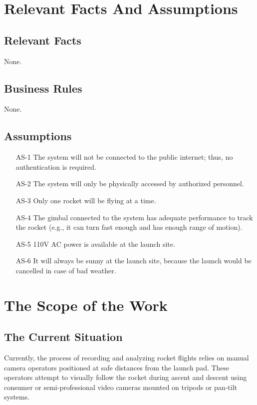 \documentclass[12pt]{article}
\begin{document}
\section{Relevant Facts And Assumptions}
\subsection{Relevant Facts}

None.

\subsection{Business Rules}

None.

\subsection{Assumptions}

\begin{itemize}[leftmargin=*]
  \item[AS-1] The system will not be connected to the public internet; thus, no
        authentication is required.
  \item[AS-2] The system will only be physically accessed by authorized personnel.
  \item[AS-3] Only one rocket will be flying at a time.
  \item[AS-4] The gimbal connected to the system has adequate performance to track the
        rocket (e.g., it can turn fast enough and has enough range of motion).
  \item[AS-5] 110V AC power is available at the launch site.
  \item[AS-6] It will always be sunny at the launch site, because the launch would be
        cancelled in case of bad weather.
\end{itemize}

\section{The Scope of the Work}
\subsection{The Current Situation}

Currently, the process of recording and analyzing rocket flights relies on
manual camera operators positioned at safe distances from the launch pad. These
operators attempt to visually follow the rocket during ascent and descent using
consumer or semi-professional video cameras mounted on tripods or pan-tilt
systems.
\end{document}
